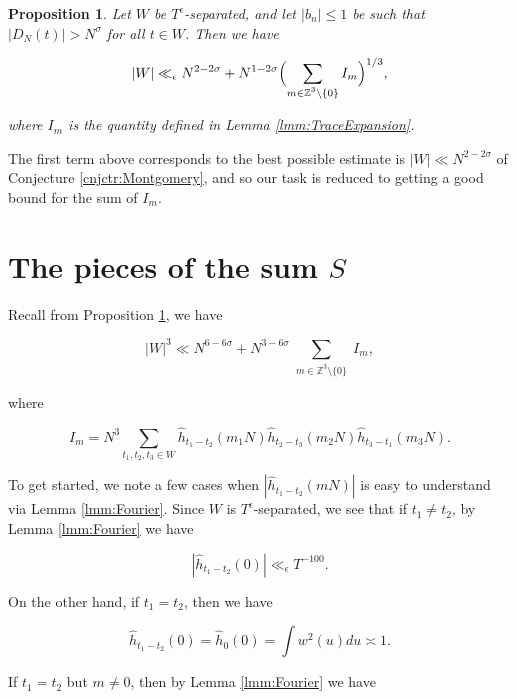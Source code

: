 \documentclass{amsart}
\theoremstyle{plain}
\newtheorem{prpstn}[thrm]{Proposition}
\numberwithin{equation}{section}
\newcommand{\ZZ}{\mathbb{Z}}
\begin{document}
%
%


\begin{prpstn}\label{prpstn:ImBound}
Let $W$ be $T^\epsilon$-separated, and let $|b_n|\le 1$ be such that $|D_N(t)|>N^\sigma$ for all $t\in W$. Then we have

\[
|W|\ll_\epsilon N^{2-2\sigma}+N^{1-2\sigma}\Bigl(\sum_{\substack{m\in \mathbb{Z}^3\setminus\{0\}}}I_m\Bigr)^{1/3},
\]

where $I_m$ is the quantity defined in Lemma \ref{lmm:TraceExpansion}.
\end{prpstn} 

The first term above corresponds to the best possible estimate is $|W|\ll N^{2-2\sigma}$ of Conjecture \ref{cnjctr:Montgomery}, and so our task is reduced to getting a good bound for the sum of $I_m$.

%
%
%
%


\section{The pieces of the sum \texorpdfstring{$S$}{S}}

Recall from Proposition \ref{prpstn:ImBound}, we have

\[
 |W|^{3} \ll N^{6-6\sigma} + N^{3-6\sigma}\sum_{\substack{m \in \ZZ^3\setminus\{0\}}} I_m,
 \]
 
 where
 
 \[
 I_m = N^3 \sum_{t_1,t_2,t_3\in W}\widehat{h}_{t_1-t_2}(m_1N)\widehat{h}_{t_2-t_3}(m_2N)\widehat{h}_{t_3-t_1}(m_3N). 
 \]
 
To get started, we note a few cases when $|\widehat{h}_{t_1 - t_2}(mN)|$ is easy to understand via Lemma \ref{lmm:Fourier}.   Since $W$ is $T^\epsilon$-separated,  we see that if $t_1 \ne t_2$, by Lemma \ref{lmm:Fourier} we have

\begin{equation}\label{tdiffm0} 
| \widehat{h}_{t_1-t_2}(0) | \ll_\epsilon T^{-100}.  
\end{equation}

On the other hand,  if $t_1 = t_2$,  then we have

\begin{equation}
\label{tsamem0} 
\widehat{h}_{t_1 - t_2}(0) = \widehat{h}_0(0) = \int w^2(u) du \asymp 1.
\end{equation}

If $t_1 = t_2$ but $m \not= 0$,  then by Lemma \ref{lmm:Fourier} we have
\end{document}
